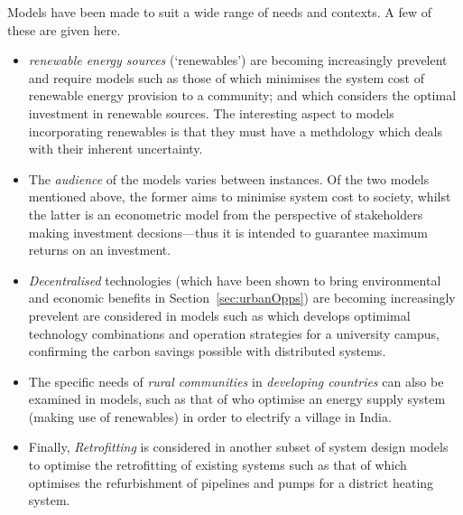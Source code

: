 Models have been made to suit a wide range of needs and contexts. A few of these are given here. 
\begin{itemize}
	\item \emph{renewable energy sources} (`renewables') are becoming increasingly prevelent and require models such as those of \citet{Cai2009a} which minimises the system cost of renewable energy provision to a community; and \citet{Fleten2005} which considers the optimal investment in renewable sources. The interesting aspect to models incorporating renewables is that they must have a methdology which deals with their inherent uncertainty. 
	\item The \emph{audience} of the models varies between instances. Of the two models mentioned above, the former aims to minimise system cost to society, whilst the latter is an econometric model from the perspective of stakeholders making investment decsions---thus it is intended to guarantee maximum returns on an investment.  
	\item \emph{Decentralised} technologies (which have been shown to bring environmental and economic benefits in Section~\ref{sec:urbanOpps}) are becoming increasingly prevelent are considered in models such as \citet{Ren2010} which develops optimimal technology combinations and operation strategies for a university campus, confirming the carbon savings possible with distributed systems. 
	\item The specific needs of \emph{rural communities} in \emph{developing countries} can also be examined in models, such as that of \citet{Kumaravel2012} who optimise an energy supply system (making use of renewables) in order to electrify a village in India. 
	\item Finally, \emph{Retrofitting} is considered in another subset of system design models to optimise the retrofitting of existing systems such as that of \citet{Bojic2010} which optimises the refurbishment of pipelines and pumps for a district heating system.
\end{itemize}

